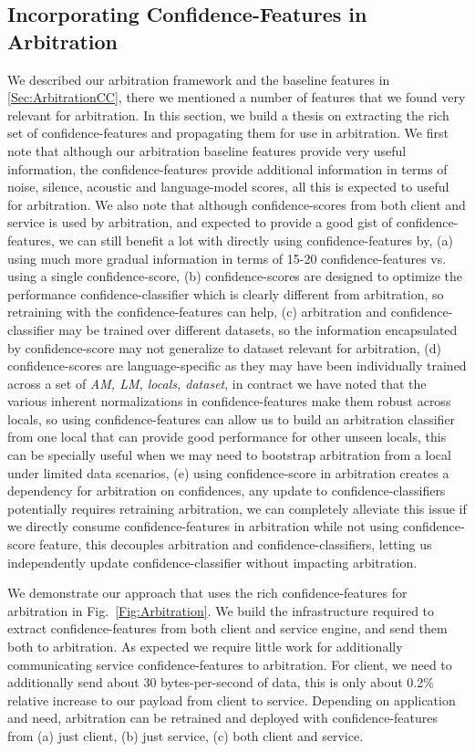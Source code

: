 \subsection{Incorporating Confidence-Features in Arbitration}
We described our arbitration framework and the baseline features in \ref{Sec:ArbitrationCC}, there we mentioned a number of features that we found very relevant for arbitration. In this section, we build a thesis on extracting the rich set of confidence-features and propagating them for use in arbitration. We first note that although our arbitration baseline features provide very useful information, the confidence-features provide additional information in terms of noise, silence, acoustic and language-model scores, all this is expected to useful for arbitration. We also note that although confidence-scores from both client and service is used by arbitration, and expected to provide a good gist of confidence-features, we can still benefit a lot with directly using confidence-features by, (a) using much more gradual information in terms of 15-20 confidence-features vs. using a single confidence-score, (b) confidence-scores are designed to optimize the performance confidence-classifier which is clearly different from arbitration, so retraining with the confidence-features can help, (c) arbitration and confidence-classifier may be trained over different datasets, so the information encapsulated by confidence-score may not generalize to dataset relevant for arbitration, (d) confidence-scores are language-specific as they may have been individually trained across a set of \emph{AM, LM, locals, dataset}, in contract we have noted that the various inherent normalizations in confidence-features make them robust across locals, so using confidence-features can allow us to build an arbitration classifier from one local that can provide good performance for other unseen locals, this can be specially useful when we may need to bootstrap arbitration from a local under limited data scenarios, (e) using confidence-score in arbitration creates a dependency for arbitration on confidences, any update to confidence-classifiers potentially requires retraining arbitration, we can completely alleviate this issue if we directly consume confidence-features in arbitration while not using confidence-score feature, this decouples arbitration and confidence-classifiers, letting us independently update confidence-classifier without impacting arbitration.

We demonstrate our approach that uses the rich confidence-features for arbitration in Fig.~\ref{Fig:Arbitration}. We build the infrastructure required to extract confidence-features from both client and service engine, and send them both to arbitration. As expected we require little work for additionally communicating service confidence-features to arbitration. For client, we need to additionally send about 30 bytes-per-second of data, this is only about 0.2\% relative increase to our payload from client to service. Depending on application and need, arbitration can be retrained and deployed with confidence-features from (a) just client, (b) just service, (c) both client and service. 

